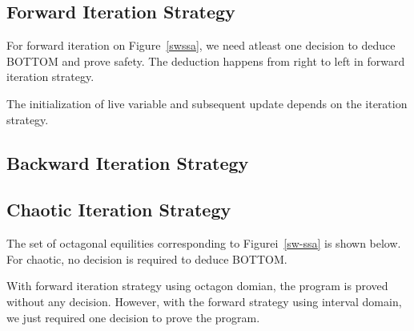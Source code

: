\subsection{Forward Iteration Strategy}
For forward iteration on Figure~\ref{swssa}, we need atleast 
one decision to deduce BOTTOM and prove safety. The deduction 
happens from right to left in forward iteration strategy.

The initialization of live variable and subsequent update depends on the iteration strategy.

\subsection{Backward Iteration Strategy}

\subsection{Chaotic Iteration Strategy}  
The set of octagonal equilities corresponding to Figurei~\ref{sw-ssa}
is shown below. For chaotic, no decision is required to deduce BOTTOM.


With forward iteration strategy using octagon domian, the program 
is proved without any decision. However, with the forward strategy
using interval domain, we just required one decision to prove the program. 
